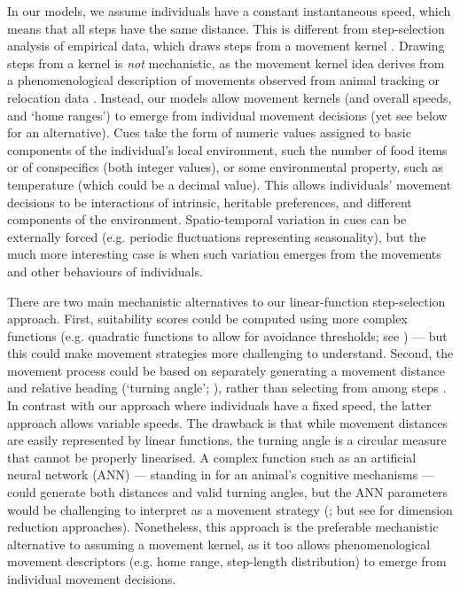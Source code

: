 In our models, we assume individuals have a constant instantaneous speed, which means that all steps have the same distance.
This is different from step-selection analysis of empirical data, which draws steps from a movement kernel \parencite{fortin2005,manly2002,avgar2016}.
Drawing steps from a kernel \parencite*[see e.g.][]{white2018} is \textit{not} mechanistic, as the movement kernel idea derives from a phenomenological description of movements observed from animal tracking or relocation data \parencite{fortin2005}.
Instead, our models allow movement kernels (and overall speeds, and `home ranges') to emerge from individual movement decisions (yet see below for an alternative).
Cues take the form of numeric values assigned to basic components of the individual's local environment, such the number of food items or of conspecifics (both integer values), or some environmental property, such as temperature (which could be a decimal value).
This allows individuals' movement decisions to be interactions of intrinsic, heritable preferences, and different components of the environment.
Spatio-temporal variation in cues can be externally forced (e.g. periodic fluctuations representing seasonality), but the much more interesting case is when such variation emerges from the movements and other behaviours of individuals.

There are two main mechanistic alternatives to our linear-function step-selection approach.
First, suitability scores could be computed using more complex functions (e.g. quadratic functions to allow for avoidance thresholds; see \cite{white2018}) --- but this could make movement strategies more challenging to understand.
Second, the movement process could be based on separately generating a movement distance and relative heading (`turning angle'; \cite{calenge2009}), rather than selecting from among steps \parencite{mueller2011}.
In contrast with our approach where individuals have a fixed speed, the latter approach allows variable speeds.
The drawback is that while movement distances are easily represented by linear functions, the turning angle is a circular measure that cannot be properly linearised.
A complex function such as an artificial neural network (ANN) --- standing in for an animal's cognitive mechanisms --- could generate both distances and valid turning angles, but the ANN parameters would be challenging to interpret as a movement strategy (\cite{mueller2011}; but see \cite{bastille-rousseau2019} for dimension reduction approaches).
Nonetheless, this approach is the preferable mechanistic alternative to assuming a movement kernel, as it too allows phenomenological movement descriptors (e.g. home range, step-length distribution) to emerge from individual movement decisions.

